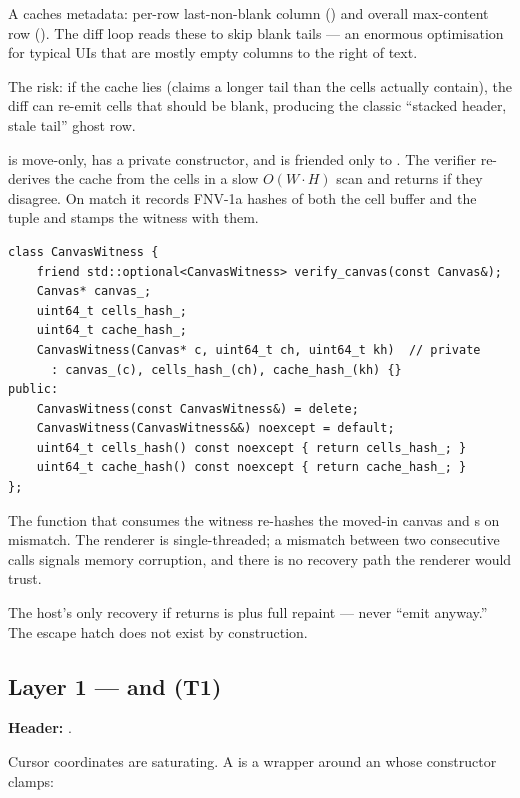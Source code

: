 A  caches metadata: per-row last-non-blank column
() and overall max-content row
(). The diff loop reads these to skip blank tails ---
an enormous optimisation for typical UIs that are mostly empty
columns to the right of text.

The risk: if the cache lies (claims a longer tail than the cells
actually contain), the diff can re-emit cells that should be blank,
producing the classic ``stacked header, stale tail'' ghost row.

 is move-only, has a private constructor, and is
friended only to . The verifier re-derives the
cache from the cells in a slow $O(W \cdot H)$ scan and returns
 if they disagree. On match it records FNV-1a hashes
of both the cell buffer and the  tuple
and stamps the witness with them.

\begin{lstlisting}
class CanvasWitness {
    friend std::optional<CanvasWitness> verify_canvas(const Canvas&);
    Canvas* canvas_;
    uint64_t cells_hash_;
    uint64_t cache_hash_;
    CanvasWitness(Canvas* c, uint64_t ch, uint64_t kh)  // private
      : canvas_(c), cells_hash_(ch), cache_hash_(kh) {}
public:
    CanvasWitness(const CanvasWitness&) = delete;
    CanvasWitness(CanvasWitness&&) noexcept = default;
    uint64_t cells_hash() const noexcept { return cells_hash_; }
    uint64_t cache_hash() const noexcept { return cache_hash_; }
};
\end{lstlisting}

The  function that consumes the witness re-hashes the
moved-in canvas and s on mismatch. The renderer is
single-threaded; a mismatch between two consecutive calls signals
memory corruption, and there is no recovery path the renderer would
trust.

The host's only recovery if  returns
 is  plus full repaint --- never
``emit anyway.'' The escape hatch does not exist by construction.

\subsection{Layer 1 ---  and  (T1)}

\textbf{Header:} .

Cursor coordinates are saturating. A  is a wrapper
around an  whose constructor clamps:

